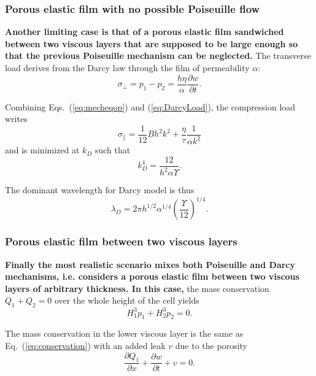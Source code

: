 \documentclass[twocolumn,superscriptaddress,showpacs,preprintnumbers,
amsmath,amssymb,prl]{revtex4-1}
\newcommand{\seb}[1]{\textbf{\color{blue}#1}} %
\begin{document}
\subsubsection*{Porous elastic film with no possible Poiseuille flow}
\seb{Another limiting case is that of a porous elastic film sandwiched between two viscous layers that are supposed to be large enough so that the previous Poiseuille mechanism can be neglected.} The transverse load derives from the Darcy law through the film of permeability $\alpha$:
\begin{equation}
\sigma_\perp = p_1-p_2 = \frac{h\eta}{\alpha}\frac{\partial w}{\partial t}.
\label{eq:DarcyLoad}
\end{equation}

Combining Eqs.~(\ref{eq:mecheqop}) and (\ref{eq:DarcyLoad}), the compression load writes
\begin{equation}
\sigma_\parallel = \frac{1}{12}B h^2 k^2 + \frac{\eta}{\tau}\frac{1}{\alpha k^2}
\label{eq:sigma0D}
\end{equation}
and is minimized at $k_D$ such that
\begin{equation}
k_D^4 = \frac{12}{h^2\alpha\Upsilon}.
\label{eq:kD}
\end{equation}

The dominant wavelength for Darcy model is thus
\begin{equation}
\lambda_D = 2\pi h^{1/2}\alpha^{1/4}\left(\frac{\Upsilon}{12}\right)^{1/4}.
\end{equation}


\subsubsection*{Porous elastic film between two viscous layers}
\seb{Finally the most realistic scenario mixes both Poiseuille and Darcy mechanisms, i.e. considers a porous elastic film between two viscous layers of arbitrary thickness. In this case,} the mass conservation $Q_1 + Q_2 = 0$ over the whole height of the cell yields
\begin{equation}
H_1^3 p_1 + H_2^3 p_2 = 0.
\label{eq:pressures}
\end{equation}

The mass conservation in the lower viscous layer is the same as Eq.~(\ref{eq:conservation}) with an added leak $v$ due to the porosity
\begin{equation}
\frac{\partial Q_1}{\partial x} + \frac{\partial w}{\partial t} + v = 0.
\label{eq:conservationDarcy}
\end{equation}
\end{document}
